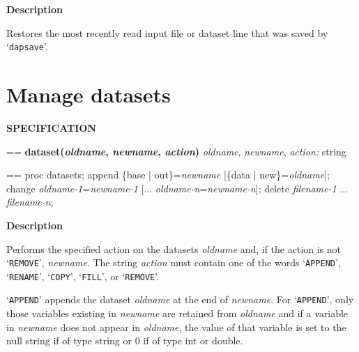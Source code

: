 \documentclass{book}
\makeatletter
\newcommand\Texinfocommandstyletextvar[1]{{\normalfont{}\textsl{#1}}}%
\newenvironment{Texinfopreformatted}{%
  \par\GNUTobeylines\obeyspaces\frenchspacing\parskip=\z@\parindent=\z@}{}
{\catcode`\^^M=13 \gdef\GNUTobeylines{\catcode`\^^M=13 \def^^M{\null\par}}}
\newenvironment{Texinfoindented}{\begin{list}{}{}\item\relax}{\end{list}}
\renewcommand{\_}{\Texinfounderscore\discretionary{}{}{}}
\makeatother
\begin{document}
\noindent{}\textbf{Description}

Restores the most recently read input file or dataset line that was
saved by `\texttt{dap\_save}'.

\section{{Manage datasets}}
\label{anchor:Manage-datasets}%

\noindent{}\textbf{SPECIFICATION}
\begin{Texinfoindented}
\begin{Texinfopreformatted}%
\textbf{dataset(\Texinfocommandstyletextvar{oldname}, \Texinfocommandstyletextvar{newname}, \Texinfocommandstyletextvar{action})}
\Texinfocommandstyletextvar{oldname}, \Texinfocommandstyletextvar{newname}, \Texinfocommandstyletextvar{action:} string
\end{Texinfopreformatted}
\end{Texinfoindented}

\begin{Texinfoindented}
\begin{Texinfopreformatted}%
proc datasets;
append \{base | out\}=\Texinfocommandstyletextvar{newname} [\{data | new\}=\Texinfocommandstyletextvar{oldname}];
change \Texinfocommandstyletextvar{oldname-1}=\Texinfocommandstyletextvar{newname-1} [... \Texinfocommandstyletextvar{oldname-n}=\Texinfocommandstyletextvar{newname-n}];
delete \Texinfocommandstyletextvar{filename-1} ... \Texinfocommandstyletextvar{filename-n};
\end{Texinfopreformatted}
\end{Texinfoindented}

%
%
%
%
%
%
%
%

\noindent{}\textbf{Description}

Performs the specified action on the datasets \Texinfocommandstyletextvar{oldname} and, if the action is not
`\texttt{REMOVE}', \Texinfocommandstyletextvar{newname}.
The string \Texinfocommandstyletextvar{action} must contain one of the words
`\texttt{APPEND}', `\texttt{RENAME}', `\texttt{COPY}', `\texttt{FILL}', or `\texttt{REMOVE}'.

`\texttt{APPEND}' appends
the dataset \Texinfocommandstyletextvar{oldname} at the end of \Texinfocommandstyletextvar{newname}. For `\texttt{APPEND}',
only those variables existing
in \Texinfocommandstyletextvar{newname} are retained from \Texinfocommandstyletextvar{oldname} and if a variable
in \Texinfocommandstyletextvar{newname} does not appear in
\Texinfocommandstyletextvar{oldname}, the value of that variable is set to the null string if of type string or
0 if of type int or double.
\end{document}
